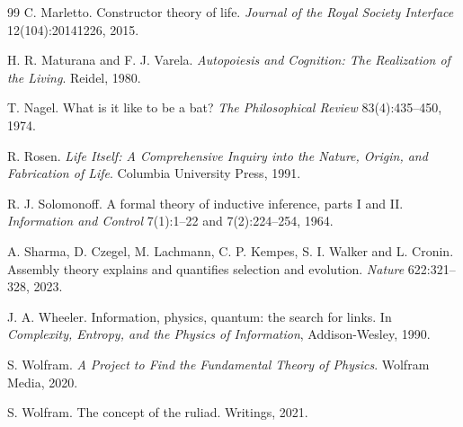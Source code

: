 \begin{thebibliography}{99}
 C. Marletto. Constructor theory of life. \emph{Journal of the
Royal Society Interface} 12(104):20141226, 2015.

 H. R. Maturana and F. J. Varela. \emph{Autopoiesis and
Cognition: The Realization of the Living}. Reidel, 1980.

 T. Nagel. What is it like to be a bat? \emph{The Philosophical
Review} 83(4):435--450, 1974.

 R. Rosen. \emph{Life Itself: A Comprehensive Inquiry into the
Nature, Origin, and Fabrication of Life}. Columbia University Press, 1991.

 R. J. Solomonoff. A formal theory of inductive inference,
parts I and II. \emph{Information and Control} 7(1):1--22 and 7(2):224--254, 1964.

 A. Sharma, D. Czegel, M. Lachmann, C. P. Kempes, S. I. Walker and
L. Cronin. Assembly theory explains and quantifies selection and evolution.
\emph{Nature} 622:321--328, 2023.

 J. A. Wheeler. Information, physics, quantum: the search for
links. In \emph{Complexity, Entropy, and the Physics of Information}, Addison-Wesley,
1990.

 S. Wolfram. \emph{A Project to Find the Fundamental Theory of
Physics}. Wolfram Media, 2020.

 S. Wolfram. The concept of the ruliad. Writings, 2021.

\end{thebibliography}

